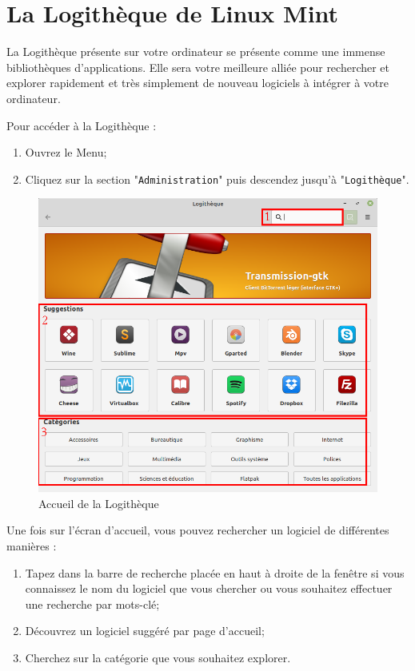 \documentclass[12pt]{book}
\begin{document}
\section{La Logithèque de Linux Mint}\label{sec:logitheque}
	La Logithèque présente sur votre ordinateur se présente comme une immense bibliothèques d'applications.
	Elle sera votre meilleure alliée pour rechercher et explorer rapidement et très simplement de nouveau logiciels à intégrer à votre ordinateur.\par
	Pour accéder à la Logithèque :
	\begin{enumerate}
		\item Ouvrez le Menu;
		\item Cliquez sur la section "\texttt{Administration}" puis descendez jusqu'à "\texttt{Logithèque}".
	\end{enumerate}\par
	\begin{figure}[h]
		\centering
		\includegraphics[width=.8\textwidth]{include/logitheque.png}
		\caption{Accueil de la Logithèque}
		\label{fig:logitheque}
	\end{figure}\par
	Une fois sur l'écran d'accueil, vous pouvez rechercher un logiciel de différentes manières :
	\begin{enumerate}
		\item Tapez dans la barre de recherche placée en haut à droite de la fenêtre si vous connaissez le nom du logiciel que vous chercher ou vous souhaitez effectuer une recherche par mots-clé;
		\item Découvrez un logiciel suggéré par page d'accueil;
		\item Cherchez sur la catégorie que vous souhaitez explorer.
	\end{enumerate}
\end{document}
